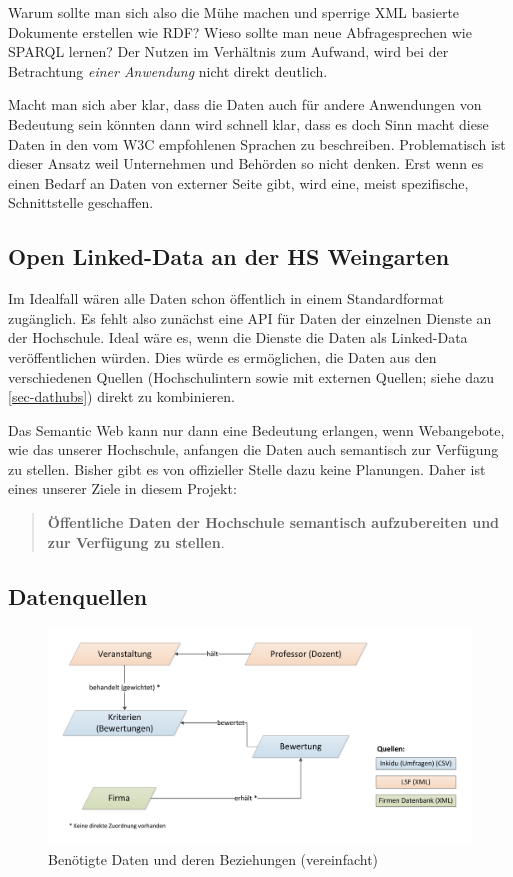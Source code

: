 Warum sollte man sich also die Mühe machen und sperrige XML basierte Dokumente erstellen wie RDF? Wieso sollte man neue Abfragesprechen wie SPARQL lernen? Der Nutzen im Verhältnis zum Aufwand, wird bei der Betrachtung  \textit{einer Anwendung} nicht direkt deutlich.

Macht man sich aber klar, dass die Daten auch für andere Anwendungen von Bedeutung sein könnten dann wird schnell klar, dass es doch Sinn macht diese Daten in den vom W3C empfohlenen Sprachen zu beschreiben. Problematisch ist dieser Ansatz weil Unternehmen und Behörden so nicht denken. Erst wenn es einen Bedarf an Daten von externer Seite gibt, wird eine, meist spezifische, Schnittstelle geschaffen.

\subsection{Open Linked-Data an der HS Weingarten}
\label{sec-open-linked-data-hs}
Im Idealfall wären alle Daten schon öffentlich in einem Standardformat zugänglich. Es fehlt also zunächst eine API für Daten der einzelnen Dienste an der Hochschule. Ideal wäre es, wenn die Dienste die Daten als Linked-Data veröffentlichen würden. Dies würde es ermöglichen, die Daten aus den verschiedenen Quellen (Hochschulintern sowie mit externen Quellen; siehe dazu \ref{sec-dathubs}) direkt zu kombinieren.

Das Semantic Web kann nur dann eine Bedeutung erlangen, wenn Webangebote, wie das unserer Hochschule, anfangen die Daten auch semantisch zur Verfügung zu stellen. Bisher gibt es von offizieller Stelle dazu keine Planungen. Daher ist eines unserer Ziele in diesem Projekt: 
\begin{quote}
\textbf{Öffentliche Daten der Hochschule semantisch aufzubereiten und zur Verfügung zu stellen}.
\end{quote}

\subsection{Datenquellen}
\label{sec-idee-datenquellen}
\begin{figure}[h]
	\centering
	\includegraphics[scale=0.53]{images/Highlevel-Daten-Verkuepfung-Herkunft}
	\caption{Benötigte Daten und deren Beziehungen (vereinfacht)}
	\label{graphic-highlevel-data}
\end{figure}

